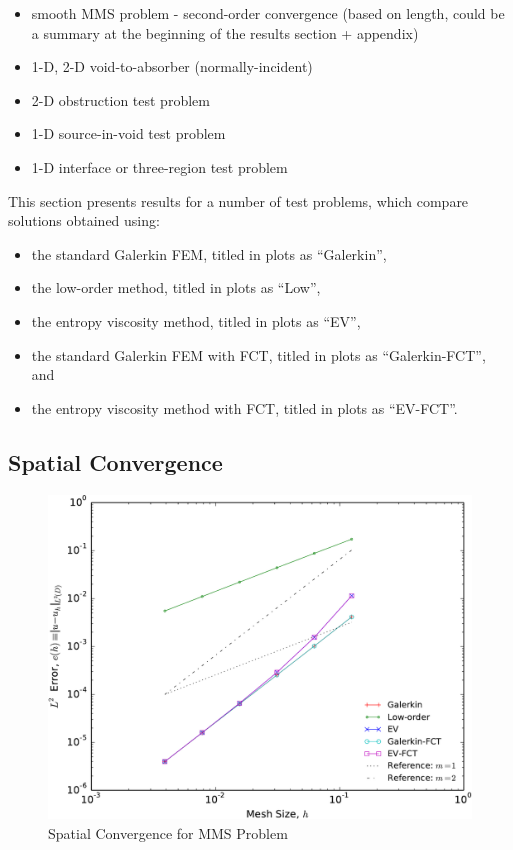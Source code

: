 
\begin{itemize}
  \item smooth MMS problem - second-order convergence (based on length, could be a summary at the beginning of the results section + appendix)
  \item 1-D, 2-D void-to-absorber (normally-incident)
  \item 2-D obstruction test problem
  \item 1-D source-in-void test problem
  \item 1-D interface or three-region test problem
\end{itemize}

This section presents results for a number of test problems, which compare
solutions obtained using:
\begin{itemize}
  \item the standard Galerkin FEM, titled in plots as ``Galerkin'',
  \item the low-order method, titled in plots as ``Low'',
  \item the entropy viscosity method, titled in plots as ``EV'',
  \item the standard Galerkin FEM with FCT, titled in plots as ``Galerkin-FCT'', and
  \item the entropy viscosity method with FCT, titled in plots as ``EV-FCT''.
\end{itemize}

\subsection{Spatial Convergence}

\begin{figure}[htb]
   \centering
      \includegraphics[width=\textwidth]
        {images/convergence_sinx.pdf}
      \caption{Spatial Convergence for MMS Problem}
   \label{fig:mms_sinx_ss}
\end{figure}
\clearpage
